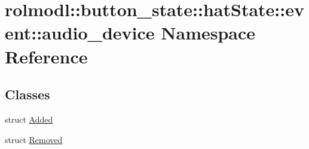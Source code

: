 \hypertarget{namespacerolmodl_1_1button__state_1_1hat_state_1_1event_1_1audio__device}{}\section{rolmodl\+::button\+\_\+state\+::hat\+State\+::event\+::audio\+\_\+device Namespace Reference}
\label{namespacerolmodl_1_1button__state_1_1hat_state_1_1event_1_1audio__device}
\subsection*{Classes}
\begin{DoxyCompactItemize}
\item 
struct \mbox{\hyperlink{structrolmodl_1_1button__state_1_1hat_state_1_1event_1_1audio__device_1_1_added}{Added}}
\item 
struct \mbox{\hyperlink{structrolmodl_1_1button__state_1_1hat_state_1_1event_1_1audio__device_1_1_removed}{Removed}}
\end{DoxyCompactItemize}
